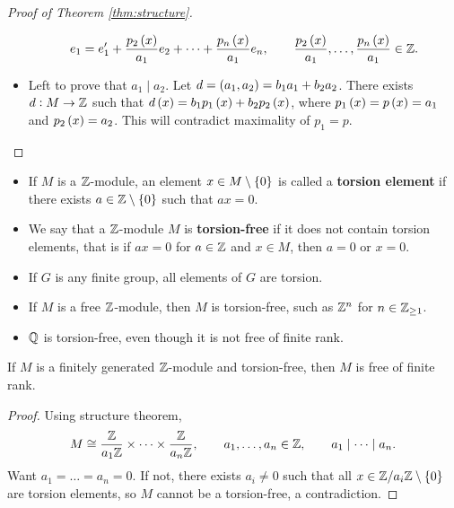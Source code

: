 \begin{proof}[Proof of Theorem \ref{thm:structure}]
\begin{itemize}
$$ e_1 = e_1' + \dfrac{p_2\br{x}}{a_1}e_2 + \dots + \dfrac{p_n\br{x}}{a_1}e_n, \qquad \dfrac{p_2\br{x}}{a_1}, \dots, \dfrac{p_n\br{x}}{a_1} \in \Z. $$
\item Left to prove that $ a_1 \mid a_2 $. Let $ d = \br{a_1, a_2} = b_1a_1 + b_2a_2 $. There exists $ d : M \to \mathbb{Z} $ such that $ d\br{x} = b_1p_1\br{x} + b_2p_2\br{x} $, where $ p_1\br{x} = p\br{x} = a_1 $ and $ p_2\br{x} = a_2 $. This will contradict maximality of $ p_1 = p $.
\end{itemize}
\end{proof}


\begin{definition}
\hfill
\begin{itemize}
\item If $ M $ is a $ \mathbb{Z} $-module, an element $ x \in M \setminus \cbr{0} $ is called a \textbf{torsion element} if there exists $ a \in \Z \setminus \cbr{0} $ such that $ ax = 0 $.
\item We say that a $ \mathbb{Z} $-module $ M $ is \textbf{torsion-free} if it does not contain torsion elements, that is if $ ax = 0 $ for $ a \in \mathbb{Z} $ and $ x \in M $, then $ a = 0 $ or $ x = 0 $.
\end{itemize}
\end{definition}

\begin{example*}
\hfill
\begin{itemize}
\item If $ G $ is any finite group, all elements of $ G $ are torsion.
\item If $ M $ is a free $ \mathbb{Z} $-module, then $ M $ is torsion-free, such as $ \mathbb{Z}^n $ for $ n \in \mathbb{Z}_{\ge 1} $.
\item $ \mathbb{Q} $ is torsion-free, even though it is not free of finite rank.
\end{itemize}
\end{example*}

\begin{proposition}
If $ M $ is a finitely generated $ \mathbb{Z} $-module and torsion-free, then $ M $ is free of finite rank.
\end{proposition}

\begin{proof}
Using structure theorem,
$$ M \cong \dfrac{\mathbb{Z}}{a_1\mathbb{Z}} \times \dots \times \dfrac{\mathbb{Z}}{a_n\mathbb{Z}}, \qquad a_1, \dots, a_n \in \mathbb{Z}, \qquad a_1 \mid \dots \mid a_n. $$
Want $ a_1 = \dots = a_n = 0 $. If not, there exists $ a_i \ne 0 $ such that all $ x \in \Z / a_i\Z \setminus \cbr{0} $ are torsion elements, so $ M $ cannot be a torsion-free, a contradiction.
\end{proof}

